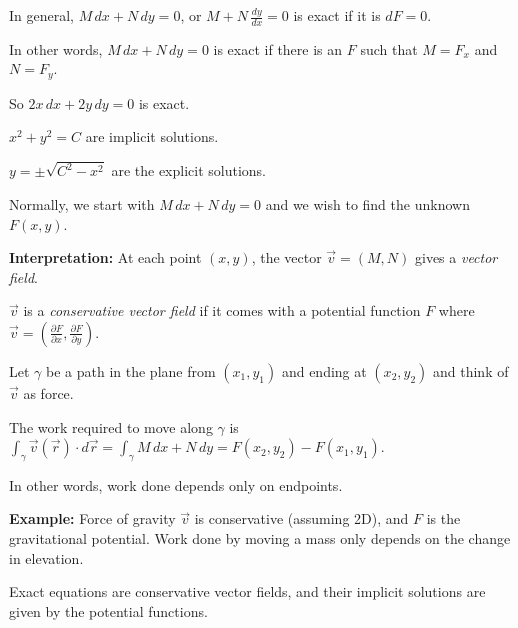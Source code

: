 \documentclass[10pt,aspectratio=169]{beamer}
\begin{document}
\begin{frame}

In general, \quad
$M \, dx + N \, dy = 0$, \quad
or
\quad
$M + N \, \frac{dy}{dx} = 0$ \quad
is exact if it is \quad $dF = 0$.

\medskip
\pause

In other words, $M \, dx + N \, dy = 0$ is exact if there is an $F$ such that $M = F_x$ and $N=F_y$.

\medskip
\pause

So 
\quad
$2x \, dx + 2y \, dy = 0$
\quad
is exact.

\medskip
\pause

$x^2+y^2=C$ are implicit solutions.

\medskip
\pause

$y = \pm \sqrt{C^2-x^2}$ are the explicit solutions.

\medskip
\pause

Normally, we start with $M \, dx + N \, dy = 0$ and we wish to find the
unknown $F(x,y)$.
\end{frame}

\begin{frame}
\textbf{Interpretation:}
At each point $(x,y)$, the vector $\vec{v} = (M,N)$ gives a \emph{vector
field}.

\medskip
\pause

$\vec{v}$ is a \emph{conservative vector field} if it comes with a potential
function $F$ where
$\vec{v} = \left( \frac{\partial F}{\partial x} ,\frac{\partial F}{\partial
y} \right)$.

\medskip
\pause

Let $\gamma$ be a path in the plane from $(x_1,y_1)$ and ending at
$(x_2,y_2)$ and think of $\vec{v}$ as force.

\medskip

The work required to move along $\gamma$ is
\quad
$\displaystyle
\int_\gamma \vec{v}(\vec{r}) \cdot d\vec{r}
=
\int_\gamma M \, dx + N \, dy
=
F(x_2,y_2) - F(x_1,y_1)$.

\medskip
\pause

In other words, work done depends only on endpoints.

\medskip
\pause

\textbf{Example:} Force of gravity $\vec{v}$ is conservative (assuming 2D),
and $F$ is the gravitational potential.
\pause
Work done by moving a mass only depends on the change in elevation.

\medskip
\pause

Exact equations are conservative vector fields, and
their
implicit solutions are given by the potential functions.

\end{frame}
\end{document}
